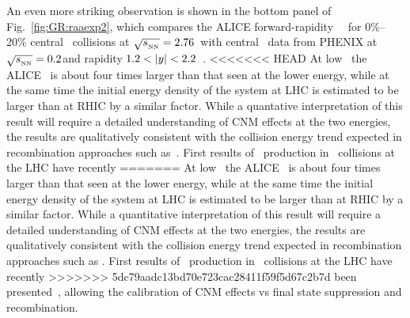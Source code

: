 An even more striking observation is shown in the bottom panel of Fig.~\ref{fig:GR:raaexp2}, which compares
the ALICE forward-rapidity \jpsi\ \Raa\ for 0\%--20\% central \PbPb\ collisions at  $\sqrt{s_{_{\rm NN}}} = 2.76$\TeV\
with central \AuAu\ data from PHENIX at $\sqrt{s_{_{\rm NN}}} = 0.2$\GeV and rapidity $1.2 < |y| < 2.2$~\cite{Adare:2011yf}.
<<<<<<< HEAD
At low \pT\ the ALICE \Raa\ is about four times larger than that seen at the lower energy, while 
at the same time the initial energy density of the system at LHC is estimated to be larger than at 
RHIC by a similar factor. While a quantative interpretation of this result will require 
a detailed understanding of CNM effects at the two energies, the results are qualitatively consistent 
with the collision energy trend expected in recombination approaches such as~\cite{Zhao:2007hh,Zhou:2013aea,Liu:2009nb}.
First results of \jpsi\ production in \pPb\ collisions at the LHC have recently 
=======
At low \pT\ the ALICE \Raa\ is about four times larger than that seen at the lower energy, while
at the same time the initial energy density of the system at LHC is estimated to be larger than at
RHIC by a similar factor. While a quantitative interpretation of this result will require
a detailed understanding of CNM effects at the two energies, the results are qualitatively consistent
with the collision energy trend expected in recombination approaches such as
\cite{Zhao:2007hh,Zhou:2013aea,Liu:2009nb}.
First results of \jpsi\ production in \pPb\ collisions at the LHC have recently
>>>>>>> 5dc79aadc13bd70e723cac28411f59f5d67c2b7d
been presented~\cite{Abelev:2013yxa,Aaij:2013zxa}, allowing
the calibration of CNM effects vs final state suppression and recombination.


